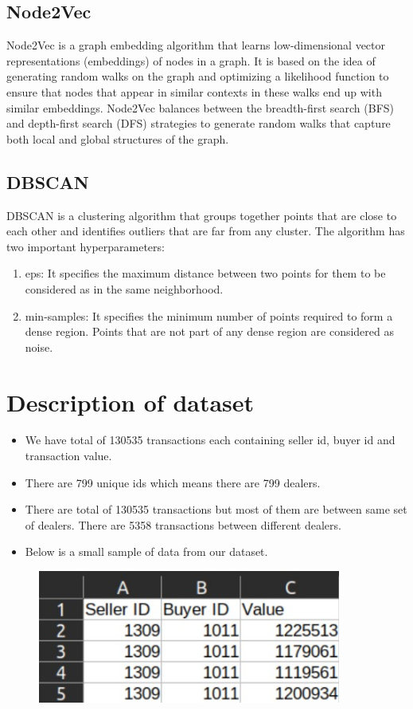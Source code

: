 \documentclass[12pt,a4paper]{article}
\begin{document}
\subsection{Node2Vec}
Node2Vec is a graph embedding algorithm that learns low-dimensional vector representations (embeddings) of nodes in a graph. It is based on the idea of generating random walks on the graph and optimizing a likelihood function to ensure that nodes that appear in similar contexts in these walks end up with similar embeddings. Node2Vec balances between the breadth-first search (BFS) and depth-first search (DFS) strategies to generate random walks that capture both local and global structures of the graph.
\subsection{DBSCAN}
DBSCAN is a clustering algorithm that groups together points that are close to each other and identifies outliers that are far from any cluster.
The algorithm has two important hyperparameters:
\begin{enumerate}
    \item eps: It specifies the maximum distance between two points for them to be considered as in the same neighborhood.
    \item  min-samples: It specifies the minimum number of points required to form a dense region. Points that are not part of any dense region are considered as noise.
\end{enumerate}



\section{Description of dataset}
\begin{itemize}
    \item We have total of 130535 transactions each containing seller id, buyer id and transaction value. 
    \item There are 799 unique ids which means there are 799 dealers.
    \item There are total of 130535 transactions but most of them are between same set of dealers. There are 5358 transactions between different dealers.
    \item Below is a small sample of data from our dataset.
\end{itemize}
\begin{figure}[H]
\centering
\label{fig:CP }
\includegraphics[width=10cm]{DatasetSample.png}
\end{figure}
\end{document}
